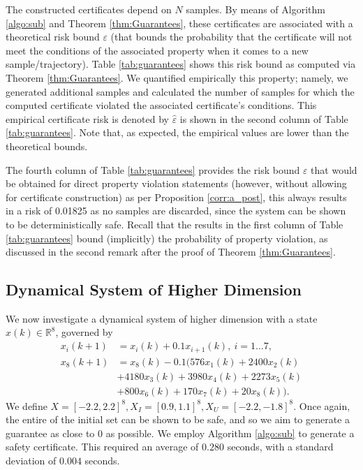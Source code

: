 The constructed certificates depend on $N$ samples. By means of Algorithm \ref{algo:sub} and Theorem \ref{thm:Guarantees}, these certificates are associated with a theoretical risk bound $\varepsilon$ (that bounds the probability that the certificate will not meet the conditions of the associated property when it comes to a new sample/trajectory). Table \ref{tab:guarantees} shows this risk bound as computed via Theorem \ref{thm:Guarantees}. We quantified empirically this property; namely, we generated additional samples and calculated the number of samples for which the computed certificate violated the associated certificate's conditions. This empirical certificate risk is denoted by $\hat{\varepsilon}$ is shown in the second column of Table \ref{tab:guarantees}. Note that, as expected, the empirical values are lower than the theoretical bounds. 

The fourth column of Table \ref{tab:guarantees} provides the risk bound $\varepsilon$ that would be obtained for direct property violation statements (however, without allowing for certificate construction) as per Proposition \ref{corr:a_post}, this always results in a risk of 0.01825 as no samples are discarded, since the system can be shown to be deterministically safe. 
Recall that the results in the first column of Table \ref{tab:guarantees} bound (implicitly) the probability of property violation, as discussed in the second remark after the proof of Theorem \ref{thm:Guarantees}.

\subsection{Dynamical System of Higher Dimension}

We now investigate a dynamical system of higher dimension with a state $x(k) \in \mathbb{R}^8$, governed by
\begin{equation}
	\begin{aligned}
		x_i(k+1) &= x_i(k) + 0.1x_{i+1}(k),~ i = 1\dots 7,\\
		x_8(k+1) &= x_8(k)- 0.1(576x_1(k)+2400x_2(k)\\
        &+4180x_3(k)+3980x_4(k)+2273x_5(k)\\
             &+800x_6(k)+170x_7(k)+20x_8(k)).
	\end{aligned}
\end{equation}
We define $X=[-2.2,2.2]^8, X_I=[0.9,1.1]^8, X_U = [-2.2,-1.8]^8$.
Once again, the entire of the initial set can be shown to be safe, and so we aim to generate a guarantee as close to $0$ as possible.
We employ Algorithm \ref{algo:sub} to generate a safety certificate. This required an average of $0.280$ seconds, with a standard deviation of $0.004$ seconds. 

